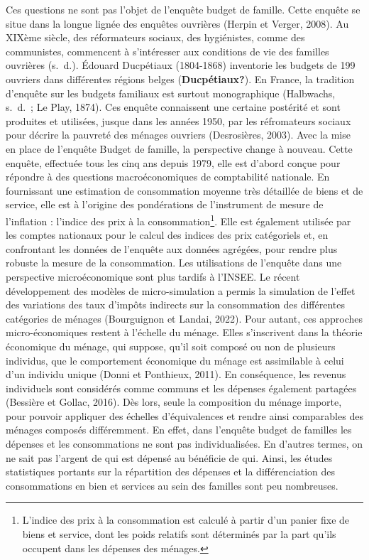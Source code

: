 \documentclass[
  12pt,
]{book}
\begin{document}
Ces questions ne sont pas l'objet de l'enquête budget de famille. Cette
enquête se situe dans la longue lignée des enquêtes ouvrières (Herpin et
Verger, 2008). Au XIXème siècle, des réformateurs sociaux, des
hygiénistes, comme des communistes, commencent à s'intéresser aux
conditions de vie des familles ouvrières (s.~d.). Édouard Ducpétiaux
(1804-1868) inventorie les budgets de 199 ouvriers dans différentes
régions belges (\textbf{Ducpétiaux?}). En France, la tradition d'enquête
sur les budgets familiaux est surtout monographique (Halbwachs, s.~d.~;
Le Play, 1874). Ces enquête connaissent une certaine postérité et sont
produites et utilisées, jusque dans les années 1950, par les
réfromateurs sociaux pour décrire la pauvreté des ménages ouvriers
(Desrosières, 2003). Avec la mise en place de l'enquête Budget de
famille, la perspective change à nouveau. Cette enquête, effectuée tous
les cinq ans depuis 1979, elle est d'abord conçue pour répondre à des
questions macroéconomiques de comptabilité nationale. En fournissant une
estimation de consommation moyenne très détaillée de biens et de
service, elle est à l'origine des pondérations de l'instrument de mesure
de l'inflation : l'indice des prix à la consommation\footnote{L'indice
  des prix à la consommation est calculé à partir d'un panier fixe de
  biens et service, dont les poids relatifs sont déterminés par la part
  qu'ils occupent dans les dépenses des ménages.}. Elle est également
utilisée par les comptes nationaux pour le calcul des indices des prix
catégoriels et, en confrontant les données de l'enquête aux données
agrégées, pour rendre plus robuste la mesure de la consommation. Les
utilisations de l'enquête dans une perspective microéconomique sont plus
tardifs à l'INSEE. Le récent développement des modèles de
micro-simulation a permis la simulation de l'effet des variations des
taux d'impôts indirects sur la consommation des différentes catégories
de ménages (Bourguignon et Landai, 2022). Pour autant, ces approches
micro-économiques restent à l'échelle du ménage. Elles s'inscrivent dans
la théorie économique du ménage, qui suppose, qu'il soit composé ou non
de plusieurs individus, que le comportement économique du ménage est
assimilable à celui d'un individu unique (Donni et Ponthieux, 2011). En
conséquence, les revenus individuels sont considérés comme communs et
les dépenses également partagées (Bessière et Gollac, 2016). Dès lors,
seule la composition du ménage importe, pour pouvoir appliquer des
échelles d'équivalences et rendre ainsi comparables des ménages composés
différemment. En effet, dans l'enquête budget de familles les dépenses
et les consommations ne sont pas individualisées. En d'autres termes, on
ne sait pas l'argent de qui est dépensé au bénéficie de qui. Ainsi, les
études statistiques portants sur la répartition des dépenses et la
différenciation des consommations en bien et services au sein des
familles sont peu nombreuses.
\end{document}
